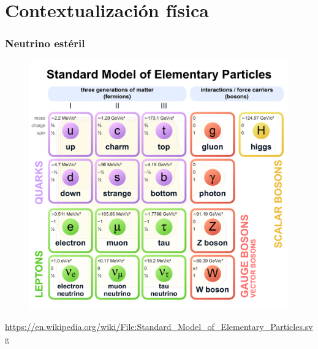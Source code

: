 \documentclass{beamer}
\begin{document}
\section{Contextualización física}
\begin{frame}
  \frametitle{Neutrino estéril}
  \begin{figure}
    \centering
        \includegraphics[scale=0.17]{Standard_Model_of_Elementary_Particles.pdf} 
  \end{figure}
  \url{https://en.wikipedia.org/wiki/File:Standard_Model_of_Elementary_Particles.svg}
\end{frame}
\end{document}
